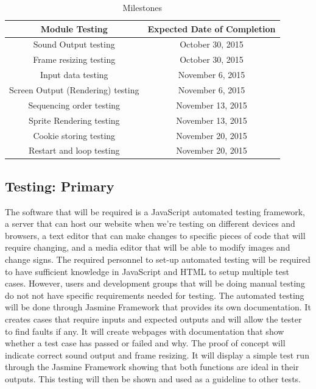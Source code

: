\documentclass[11pt, oneside]{article}   	%
\begin{document}
 \begin{table}[H]
\caption{Milestones}
\begin{center}
\begin{tabular}{|c|c|}
\hline
\textbf{Module Testing} & \textbf{Expected Date of Completion}\\
\hline
\hline
Sound Output testing & October 30, 2015\\
\hline
Frame resizing testing & October 30, 2015\\
\hline
Input data testing & November 6, 2015\\
\hline
Screen Output (Rendering) testing & November 6, 2015\\
\hline
Sequencing order testing & November 13, 2015\\
\hline
Sprite Rendering testing & November 13, 2015\\
\hline
Cookie storing testing & November 20, 2015\\
\hline
Restart and loop testing & November 20, 2015\\
\hline
\end{tabular}
\end{center}
\label{default}
\end{table}%
 
\subsection{Testing: Primary}
The software that will be required is a JavaScript automated testing framework, a server that can host our website when we're testing on different devices and browsers, a text editor that can make changes to specific pieces of code that will require changing, and a media editor that will be able to modify images and change signs. 
The required personnel to set-up automated testing will be required to have sufficient knowledge in JavaScript and HTML to setup multiple test cases. However, users and development groups that will be doing manual testing do not not have specific requirements needed for testing. 
The automated testing will be done through Jasmine Framework that provides its own documentation. It creates cases that require inputs and expected outputs and will allow the tester to find faults if any. It will create webpages with documentation that show whether a test case has passed or failed and why. 
The proof of concept will indicate correct sound output and frame resizing. It will display a simple test run through the Jasmine Framework showing that both functions are ideal in their outputs. This testing will then be shown and used as a guideline to other tests. 
\\
\\
\\
\end{document}
